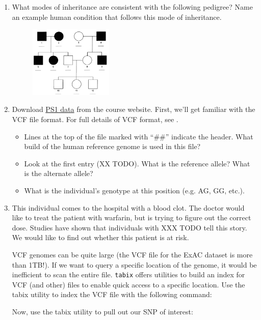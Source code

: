 \documentclass[12pt]{article}
\begin{document}
\begin{enumerate}
\item What modes of inheritance are consistent with the following pedigree? Name an example human condition that follows this mode of inheritance.

\begin{figure}[h!]
\centering
\includegraphics[width=150px]{pset1dominant.png}
\end{figure}

\item Download \href{https://gymreklab.github.io/teaching/personal\_genomics/ps1\_introduction.html}{PS1 data} from the course website. First, we'll get familiar with the VCF file format. For full details of VCF format, see . %
\begin{itemize}
\item Lines at the top of the file marked with ``\#\#'' indicate the header. What build of the human reference genome is used in this file?
\item Look at the first entry (XX TODO). What is the reference allele? What is the alternate allele?
\item What is the individual's genotype at this position (e.g. AG, GG, etc.).
\end{itemize}

\item This individual comes to the hospital with a blood clot. The doctor would like to treat the patient with warfarin, but is trying to figure out the correct dose. Studies have shown that individuals with XXX TODO tell this story. We would like to find out whether this patient is at risk.

VCF genomes can be quite large (the VCF file for the ExAC dataset is more than 1TB!). If we want to query a specific location of the genome, it would be inefficient to scan the entire file. \texttt{tabix} offers utilities to build an index for VCF (and other) files to enable quick access to a specific location. Use the tabix utility to index the VCF file with the following command:

Now, use the tabix utility to pull out our SNP of interest:


\end{enumerate}
\end{document}
